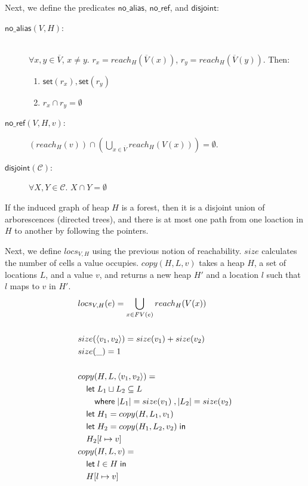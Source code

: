 \documentclass[11pt]{article}
\newcommand{\ms}[1]{\ensuremath{\mathsf{#1}}}
\newcommand{\na}[1]{\mathsf{no\_alias}(#1)}
\newcommand{\dist}[1]{\mathsf{disjoint}(#1)}
\begin{document}
\noindent
Next, we define the predicates $\ms{no\_alias}$, $\ms{no\_ref}$, and $\ms{disjoint}$:
\begin{description}
\item[$\na{V,H}$: ] \\
$\forall x,y \in \overline V$, $x \ne y$.  $r_x = reach_H(\overline V(x))$, $r_y = reach_H(\overline V(y))$. Then:
\begin{enumerate}[(1)]
\item $\ms{set}(r_x), \ms{set}(r_y)$
\item $r_x \cap r_y = \emptyset$
\end{enumerate}
\item[$\ms{no\_ref}(V,H,v)$: ] $(reach_{H}(v)) \cap (\bigcup_{x \in \overline V} reach_{H}(V(x))) = \emptyset$.
\item[$\dist{\mathcal{C}}$: ] $\forall X,Y \in \mathcal{C}$. $X \cap Y = \emptyset$ 
\end{description}
If the induced graph of heap $H$ is a forest, then it is a disjoint union of arborescences (directed trees), and there is at most one path from one loaction in $H$ to another by following the pointers.

Next, we define $locs_{V,H}$ using the previous notion of reachability. $size$ calculates the number of cells a value occupies. $copy(H,L,v)$ takes a heap $H$, a set of locations $L$, and a value $v$, and returns a new heap $H'$ and a location $l$ such that $l$ maps to $v$ in $H'$.
\begin{align*}
  &locs_{V,H}(e) = \bigcup\limits_{x \in FV(e)} reach_H(V(x))\\\\
  &size(\langle v_1, v_2\rangle) = size(v_1) + size(v_2)\\
  &size(\_) = 1\\\\
  &copy(H,L,\langle v_1, v_2\rangle) =\\
  &\quad\mathsf{let }\; L_1 \sqcup L_2 \subseteq L\\
  &\quad\quad\mathsf{ where }\; |L_1| = size(v_1) \;,|L_2| = size(v_2)\\
  &\quad\mathsf{let }\; H_1 = copy(H,L_1,v_1) \\
  &\quad\mathsf{let }\; H_2 = copy(H_1,L_2,v_2) \;\mathsf{in}\\
  &\quad H_2[l \mapsto v]\\
  &copy(H,L,v) =\\
  &\quad\mathsf{let }\; l \in H\; \mathsf{in}\\
  &\quad H[l \mapsto v]\\
\end{align*}
\end{document}
